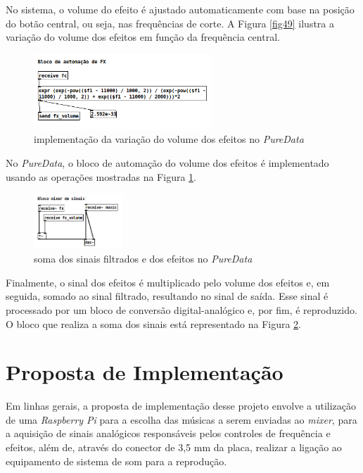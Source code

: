 No sistema, o volume do efeito é ajustado automaticamente com base na posição do botão central, ou seja, nas frequências de corte. A Figura \ref{fig49} ilustra a variação do volume dos efeitos em função da frequência central.

\begin{figure}[h]
    \centering
    \includegraphics[width=0.6\textwidth]{figuras/fig50.png}
    \caption{implementação da variação do volume dos efeitos no \textit{PureData}}
    \label{fig50}
\end{figure}

\newpage
No \textit{PureData}, o bloco de automação do volume dos efeitos é implementado usando as operações mostradas na Figura \ref{fig50}.

\begin{figure}[h]
    \centering
    \includegraphics[width=0.3\textwidth]{figuras/fig51.png}
    \caption{soma dos sinais filtrados e dos efeitos no \textit{PureData}}
    \label{fig51}
\end{figure}

Finalmente, o sinal dos efeitos é multiplicado pelo volume dos efeitos e, em seguida, somado ao sinal filtrado, resultando no sinal de saída. Esse sinal é processado por um bloco de conversão digital-analógico e, por fim, é reproduzido. O bloco que realiza a soma dos sinais está representado na Figura \ref{fig51}.

\newpage
\section{Proposta de Implementação}

Em linhas gerais, a proposta de implementação desse projeto envolve a utilização de uma \textit{Raspberry Pi} para a escolha das músicas a serem enviadas ao \textit{mixer}, para a aquisição de sinais analógicos responsáveis pelos controles de frequência e efeitos, além de, através do conector de 3,5 mm da placa, realizar a ligação ao equipamento de sistema de som para a reprodução. 


